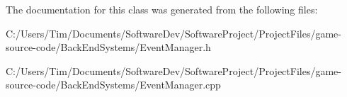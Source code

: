 The documentation for this class was generated from the following files\+:\begin{DoxyCompactItemize}
\item 
C\+:/\+Users/\+Tim/\+Documents/\+Software\+Dev/\+Software\+Project/\+Project\+Files/game-\/source-\/code/\+Back\+End\+Systems/Event\+Manager.\+h\item 
C\+:/\+Users/\+Tim/\+Documents/\+Software\+Dev/\+Software\+Project/\+Project\+Files/game-\/source-\/code/\+Back\+End\+Systems/Event\+Manager.\+cpp\end{DoxyCompactItemize}
